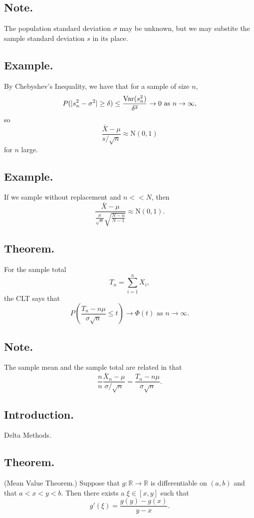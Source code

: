 \documentclass[titlepage]{article}
\begin{document}
\subsection{Note.} The population standard deviation $\sigma$ may be unknown, but we may substite the sample standard deviation $s$ in its place.

\subsection{Example.} By Chebyshev's Inequality, we have that for a sample of size $n$, 
$$P(|s_{n}^{2} - \sigma^{2}| \geq \delta) \leq \frac{\text{Var}(s_{n}^{2})}{\delta^{2}} \rightarrow 0 \text{ as } n \rightarrow \infty,$$
so 
$$\frac{\bar{X} - \mu}{s/\sqrt{n}} \approx \text{N}(0, 1)$$
for $n$ large.

\subsection{Example.} If we sample without replacement and $n << N$, then 
$$\frac{\bar{X} - \mu}{\frac{\sigma}{\sqrt{n}}\sqrt{\frac{N-n}{N-1}}} \approx \text{N}(0, 1).$$

\subsection{Theorem.} For the sample total 
$$T_{n} = \sum_{i=1}^{n}X_{i},$$
the CLT says that 
$$P\left(\frac{T_{n} - n\mu}{\sigma\sqrt{n}} \leq t\right) \rightarrow \Phi(t) \text{ as } n \rightarrow \infty.$$

\subsection{Note.} The sample mean and the sample total are related in that 
$$\frac{n}{n}\frac{\bar{X}_{n}-\mu}{\sigma/\sqrt{n}} = \frac{T_{n}-n\mu}{\sigma\sqrt{n}}.$$

\newpage {}

\subsection{Introduction.} Delta Methods.

\subsection{Theorem.} (Mean Value Theorem.) Suppose that $g: \mathbb{R} \to \mathbb{R}$ is differentiable on $(a, b)$ and that $a < x < y < b$. Then there exists a $\xi \in [x, y]$ such that 
$$g'(\xi) = \frac{g(y) - g(x)}{y - x}.$$
\end{document}
